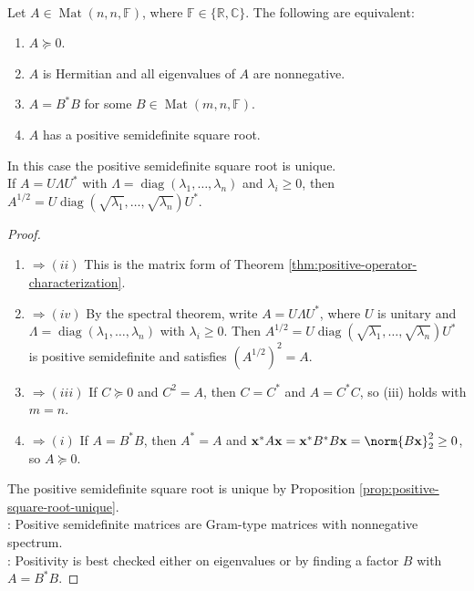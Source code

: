 \begin{theorem} \label{thm:positive-semidefinite-matrix-equivalences} \\
Let $A\in\operatorname{Mat}(n,n,\mathbb{F})$, where $\mathbb{F}\in\{\mathbb{R},\mathbb{C}\}$. The following are equivalent:
\begin{enumerate}[label=(\roman*)]
\setlength{\itemsep}{0pt}
\item $A\succeq0$.
\item $A$ is Hermitian and all eigenvalues of $A$ are nonnegative.
\item $A=B^*B$ for some $B\in\operatorname{Mat}(m,n,\mathbb{F})$.
\item $A$ has a positive semidefinite square root.
\end{enumerate}
In this case the positive semidefinite square root is unique.\\
If $A=U\Lambda U^*$ with $\Lambda=\operatorname{diag}(\lambda_1,\ldots,\lambda_n)$ and $\lambda_i\geq0$, then $A^{1/2}=U\operatorname{diag}(\sqrt{\lambda_1},\ldots,\sqrt{\lambda_n})U^*$.
\begin{proof}
\begin{enumerate}[label=(\roman*).]
\setlength{\itemsep}{0pt}
\item[$(i)$]$\Rightarrow (ii)$ This is the matrix form of Theorem \ref{thm:positive-operator-characterization}.
\item[$(ii)$]$\Rightarrow (iv)$ By the spectral theorem, write $A=U\Lambda U^*$, where $U$ is unitary and $\Lambda=\operatorname{diag}(\lambda_1,\ldots,\lambda_n)$ with $\lambda_i\geq0$. Then $A^{1/2}=U\operatorname{diag}(\sqrt{\lambda_1},\ldots,\sqrt{\lambda_n})U^*$ is positive semidefinite and satisfies $(A^{1/2})^2=A$.
\item[$(iv)$]$\Rightarrow (iii)$ If $C\succeq0$ and $C^2=A$, then $C=C^*$ and $A=C^*C$, so (iii) holds with $m=n$.
\item[$(iii)$]$\Rightarrow (i)$ If $A=B^*B$, then $A^*=A$ and $\mathbf{x}^*A\mathbf{x}=\mathbf{x}^*B^*B\mathbf{x}=\norm{B\mathbf{x}}_2^2\geq0$, so $A\succeq0$.
\end{enumerate}
The positive semidefinite square root is unique by Proposition \ref{prop:positive-square-root-unique}.\\
: Positive semidefinite matrices are Gram-type matrices with nonnegative spectrum.\\
: Positivity is best checked either on eigenvalues or by finding a factor $B$ with $A=B^*B$.
\end{proof}
\end{theorem}

